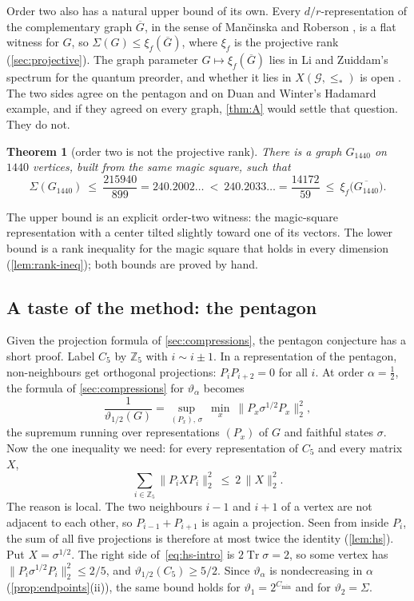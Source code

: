 \documentclass[11pt]{article}
\newtheorem{mainthm}{Theorem}
\theoremstyle{definition}
\DeclareMathOperator{\Tr}{Tr}
\newcommand{\vt}{\vartheta}
\newcommand{\cG}{\mathcal G}
\newcommand{\Cmin}{C_{\min}}
\newcommand{\Xs}{X(\cG,\le_*)}
\newcommand{\nrm}[1]{\lVert #1\rVert}
\begin{document}
Order two also has a natural upper bound of its own.  Every
$d/r$-representation of the complementary graph $\overline G$, in the sense of
Man\v{c}inska and Roberson \cite{MancinskaRoberson2016}, is a flat witness for
$G$, so $\Sigma(G)\le\xi_f(\overline G)$, where $\xi_f$ is the projective rank
(\cref{sec:projective}).  The graph parameter $G\mapsto\xi_f(\overline G)$
lies in Li and Zuiddam's spectrum for the quantum preorder, and whether it
lies in $\Xs$ is open \cite{LiZuiddam2020}.  The two sides agree on the
pentagon and on Duan and Winter's Hadamard example, and if they agreed on
every graph, \cref{thm:A} would settle that question.  They do not.

\begin{mainthm}[order two is not the projective rank]\label{thm:D}
There is a graph $G_{1440}$ on $1440$ vertices, built from the same magic
square, such that
\[
 \Sigma(G_{1440})\ \le\ \frac{215940}{899}=240.2002\ldots\ <\
 240.2033\ldots=\frac{14172}{59}\ \le\ \xi_f\bigl(\overline{G_{1440}}\bigr).
\]
\end{mainthm}

The upper bound is an explicit order-two witness: the magic-square
representation with a center tilted slightly toward one of its vectors.  The lower bound is a rank inequality for the magic
square that holds in every dimension (\cref{lem:rank-ineq}); both bounds are
proved by hand.

\subsection{A taste of the method: the pentagon}
\label{sec:taste}

Given the projection formula of \cref{sec:compressions}, the pentagon
conjecture has a short proof.  Label
$C_5$ by $\mathbb Z_5$ with $i\sim i\pm1$.  In a representation of the
pentagon, non-neighbours get orthogonal projections: $P_iP_{i+2}=0$ for all
$i$.  At order $\alpha=\frac12$, the formula of \cref{sec:compressions} for
$\vt_\alpha$ becomes
\[
 \frac{1}{\vt_{1/2}(G)}
 =\sup_{(P_x),\,\sigma}\ \min_x\ \nrm{P_x\sigma^{1/2}P_x}_2^2 ,
\]
the supremum running over representations $(P_x)$ of $G$ and faithful states
$\sigma$.  Now the one inequality we need: for every representation of $C_5$
and every matrix $X$,
\begin{equation}\label{eq:hs-intro}
 \sum_{i\in\mathbb Z_5}\nrm{P_iXP_i}_2^2\ \le\ 2\,\nrm{X}_2^2 .
\end{equation}
The reason is local.  The two neighbours $i-1$ and $i+1$ of a vertex are not
adjacent to each other, so $P_{i-1}+P_{i+1}$ is again a projection.  Seen from
inside $P_i$, the sum of all five projections is therefore at most twice the
identity (\cref{lem:hs}).  Put $X=\sigma^{1/2}$.  The right side of~\eqref{eq:hs-intro}
is $2\Tr\sigma=2$, so some vertex has $\nrm{P_i\sigma^{1/2}P_i}_2^2\le2/5$,
and $\vt_{1/2}(C_5)\ge5/2$.  Since $\vt_\alpha$ is nondecreasing in $\alpha$
(\cref{prop:endpoints}(ii)), the
same bound holds for $\vt_1=2^{\Cmin}$ and for $\vt_2=\Sigma$.
\end{document}
